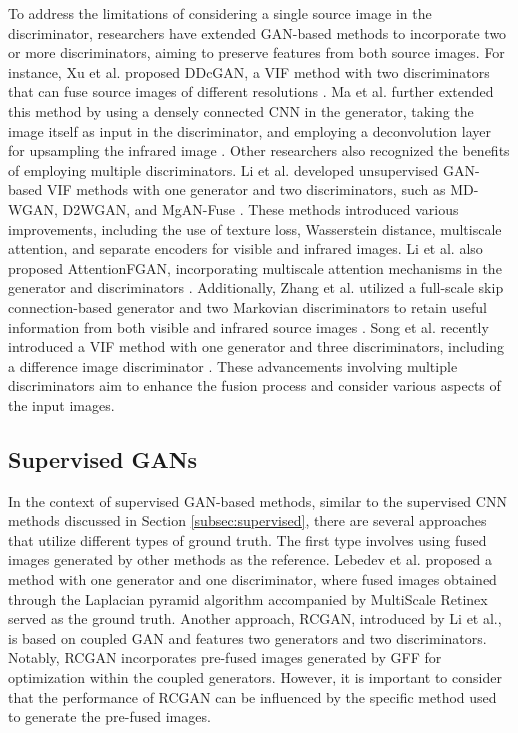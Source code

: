 To address the limitations of considering a single source image in the discriminator, researchers have extended GAN-based methods to incorporate two or more discriminators, aiming to preserve features from both source images. For instance, Xu et al. proposed DDcGAN, a VIF method with two discriminators that can fuse source images of different resolutions \cite{xu2019learning}. Ma et al. further extended this method by using a densely connected CNN in the generator, taking the image itself as input in the discriminator, and employing a deconvolution layer for upsampling the infrared image \cite{ma2020ddcgan}. Other researchers also recognized the benefits of employing multiple discriminators. Li et al. developed unsupervised GAN-based VIF methods with one generator and two discriminators, such as MD-WGAN, D2WGAN, and MgAN-Fuse \cite{li2019infrared, li2020infrared, li2020multigrained}. These methods introduced various improvements, including the use of texture loss, Wasserstein distance, multiscale attention, and separate encoders for visible and infrared images. Li et al. also proposed AttentionFGAN, incorporating multiscale attention mechanisms in the generator and discriminators \cite{li2020attentionfgan}. Additionally, Zhang et al. utilized a full-scale skip connection-based generator and two Markovian discriminators to retain useful information from both visible and infrared source images \cite{zhang2021gan}. Song et al. recently introduced a VIF method with one generator and three discriminators, including a difference image discriminator \cite{song2022triple}. These advancements involving multiple discriminators aim to enhance the fusion process and consider various aspects of the input images.

\subsection{Supervised GANs}

In the context of supervised GAN-based methods, similar to the supervised CNN methods discussed in Section \ref{subsec:supervised}, there are several approaches that utilize different types of ground truth. The first type involves using fused images generated by other methods as the reference. Lebedev et al. \cite{lebedev2019multisensor} proposed a method with one generator and one discriminator, where fused images obtained through the Laplacian pyramid algorithm accompanied by MultiScale Retinex served as the ground truth. Another approach, RCGAN, introduced by Li et al.\cite{li2019coupled}, is based on coupled GAN and features two generators and two discriminators. Notably, RCGAN incorporates pre-fused images generated by GFF \cite{li2013image} for optimization within the coupled generators. However, it is important to consider that the performance of RCGAN can be influenced by the specific method used to generate the pre-fused images.

